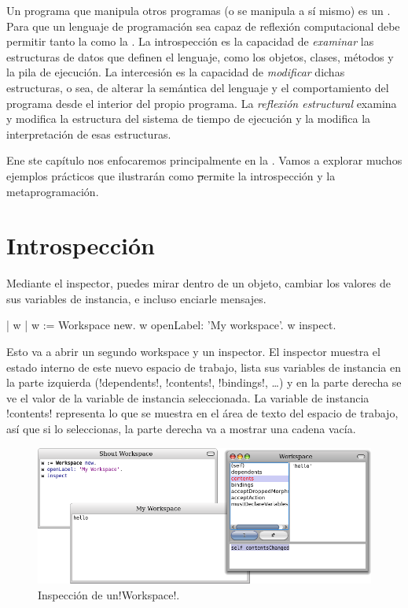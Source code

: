 \documentclass[a4paper,10pt,twoside]{book}
\begin{document}
Un programa que manipula otros programas (o se manipula a sí mismo) es
un .  Para que un lenguaje de programación sea
capaz de reflexión computacional debe permitir tanto la
 como la .  La introspección es la
capacidad de \emph{examinar} las estructuras de datos que definen el
lenguaje, como los objetos, clases, métodos y la pila de ejecución.
La intercesión es la capacidad de \emph{modificar} dichas estructuras,
o sea, de alterar la semántica del lenguaje y el comportamiento del
programa desde el interior del propio programa.  La \emph{reflexión
  estructural} examina y modifica la estructura del sistema de tiempo
de ejecución y la  modifica la
interpretación de esas estructuras.

Ene ste capítulo nos enfocaremos principalmente en la .  Vamos a explorar muchos ejemplos prácticos que
ilustrarán como \st permite la introspección y la metaprogramación.

\section{Introspección}

Mediante el inspector, puedes mirar dentro de un objeto, cambiar los
valores de sus variables de instancia, e incluso enciarle mensajes.

\begin{code}{| w |}
w := Workspace new.
w openLabel: 'My workspace'.
w inspect.
\end{code}

Esto va a abrir un segundo workspace y un inspector.  El inspector
muestra el estado interno de este nuevo espacio de trabajo, lista sus
variables de instancia en la parte izquierda (\ct!dependents!,
\ct!contents!, \ct!bindings!, \ldots) y en la parte derecha se ve el
valor de la variable de instancia seleccionada.  La variable de
instancia \ct!contents! representa lo que se muestra en el área de
texto del espacio de trabajo, así que si lo seleccionas, la parte
derecha va a mostrar una cadena vacía.

\begin{figure}[ht]\centering
        \includegraphics[width=\linewidth]{workspaceInspector}
        \caption{Inspección de un\ct!Workspace!.}
\end{figure}
\end{document}
